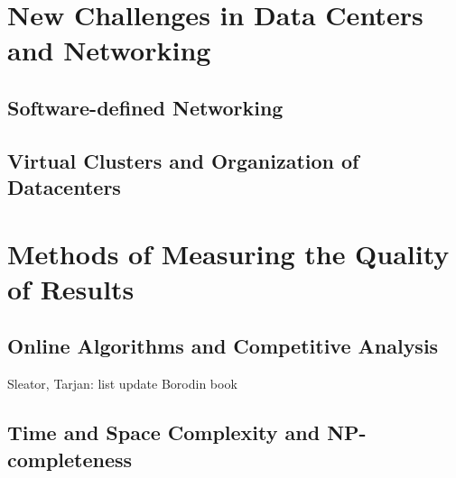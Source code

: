 \section{New Challenges in Data Centers and Networking}

\subsection{Software-defined Networking}



\subsection{Virtual Clusters and Organization of Datacenters}





\section{Methods of Measuring the Quality of Results}

\subsection{Online Algorithms and Competitive Analysis}

Sleator, Tarjan: list update \cite{competitive-analysis}
Borodin book \cite{borodin-book}

\subsection{Time and Space Complexity and NP-completeness}
